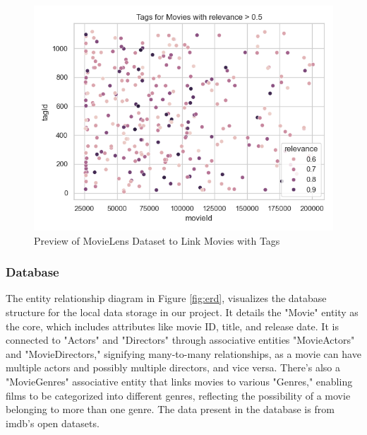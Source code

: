 \documentclass[journal]{IEEEtran}
\theoremstyle{mydefstyle}
\begin{document}
\begin{figure}
    \centering
    \includegraphics[width=1\linewidth]{doc//report//assets/tags_for_movies.png}
    \caption{Preview of MovieLens Dataset to Link Movies with Tags}
    \label{fig:ml-tag}
\end{figure}

\subsubsection{Database}
The entity relationship diagram in Figure \ref{fig:erd}, visualizes the database structure for the local data storage in our project. It details the "Movie" entity as the core, which includes attributes like movie ID, title, and release date. It is connected to "Actors" and "Directors" through associative entities "MovieActors" and "MovieDirectors," signifying many-to-many relationships, as a movie can have multiple actors and possibly multiple directors, and vice versa. There's also a "MovieGenres" associative entity that links movies to various "Genres," enabling films to be categorized into different genres, reflecting the possibility of a movie belonging to more than one genre. The data present in the database is from imdb’s open datasets\cite{IMDb}. 
\end{document}
